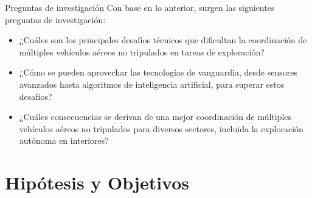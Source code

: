 \documentclass[
  24pt, %
  aspectratio=169, %
]{beamer}
\begin{document}
\begin{frame}
  
  
\end{frame}

\begin{frame}{Preguntas de investigación}
  Con base en lo anterior, surgen las siguientes preguntas de investigación:
  \begin{itemize}

  \item ¿Cuáles son los principales desafíos técnicos que dificultan la coordinación de múltiples vehículos aéreos no tripulados en tareas de exploración?
  \item ¿Cómo se pueden aprovechar las tecnologías de vanguardia, desde sensores avanzados hasta algoritmos de inteligencia artificial, para superar estos desafíos?
  \item ¿Cuáles consecuencias se derivan de una mejor coordinación de múltiples vehículos aéreos no tripulados para diversos sectores, incluida la exploración autónoma en interiores?
    
  \end{itemize}
\end{frame}

\section{Hipótesis y Objetivos}
\end{document}
